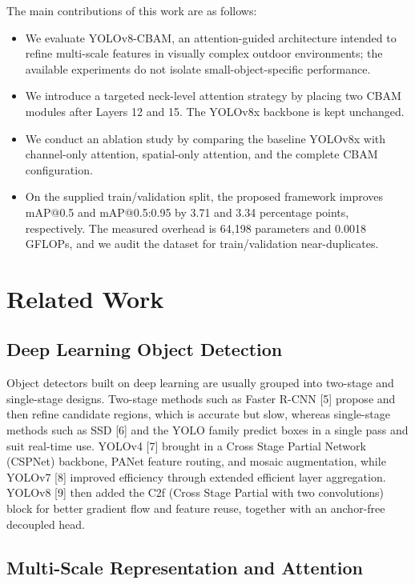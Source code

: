\documentclass[conference]{IEEEtran}
\begin{document}
The main contributions of this work are as follows:
\begin{itemize}
\item We evaluate YOLOv8-CBAM, an attention-guided architecture intended to refine multi-scale features in visually complex outdoor environments; the available experiments do not isolate small-object-specific performance.
\item We introduce a targeted neck-level attention strategy by placing two CBAM modules after Layers 12 and 15. The YOLOv8x backbone is kept unchanged.
\item We conduct an ablation study by comparing the baseline YOLOv8x with channel-only attention, spatial-only attention, and the complete CBAM configuration. 
\item On the supplied train/validation split, the proposed framework improves mAP@0.5 and mAP@0.5:0.95 by 3.71 and 3.34 percentage points, respectively. The measured overhead is 64,198 parameters and 0.0018 GFLOPs, and we audit the dataset for train/validation near-duplicates.
\end{itemize}


\section{Related Work}

\subsection{Deep Learning Object Detection}

Object detectors built on deep learning are usually grouped into two-stage and single-stage designs. Two-stage methods such as Faster R-CNN [5] propose and then refine candidate regions, which is accurate but slow, whereas single-stage methods such as SSD [6] and the YOLO family predict boxes in a single pass and suit real-time use. YOLOv4 [7] brought in a Cross Stage Partial Network (CSPNet) backbone, PANet feature routing, and mosaic augmentation, while YOLOv7 [8] improved efficiency through extended efficient layer aggregation. YOLOv8 [9] then added the C2f (Cross Stage Partial with two convolutions) block for better gradient flow and feature reuse, together with an anchor-free decoupled head.

\subsection{Multi-Scale Representation and Attention}
\end{document}

